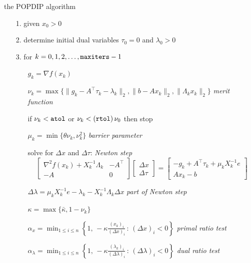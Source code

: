 \documentclass[10pt,hyperref,dvipsnames]{beamer}
\newcommand{\grad}{\nabla}
\begin{document}
\begin{frame}{the \alert{POPDIP algorithm}}

\begin{itemize}
\footnotesize
\item[1.]  given $x_0 > 0$
\item[2.]  determine initial dual variables $\tau_0=0$ and $\lambda_0>0$
\item[3.]  for $k=0,1,2,\dots,\text{\texttt{maxiters}}-1$
    \begin{itemize}
    \footnotesize
    \item[] $g_k = \grad f(x_k)$

\smallskip
    \item[] $\nu_k = \max\{\|g_k-A^\top \tau_k - \lambda_k\|_2,\|b-Ax_k\|_2,\|\Lambda_k x_k\|_2\}$  \hfill \emph{merit function}

\smallskip
    \item[] if $\nu_k<\text{\texttt{atol}}$ or $\nu_k<(\text{\texttt{rtol}})\, \nu_0$ then stop

\smallskip
    \item[] $\mu_k = \min\{\theta \nu_k,\nu_k^2\}$ \hfill \emph{barrier parameter}

\smallskip
    \item[] solve for $\Delta x$ and $\Delta \tau$: \hfill \emph{Newton step}
    $$\begin{bmatrix}
\grad^2 f(x_k) + X_k^{-1}\Lambda_k & -A^\top \\
-A             & 0
\end{bmatrix}
\begin{bmatrix}
\Delta x \\
\Delta \tau
\end{bmatrix}
=
\begin{bmatrix}
-g_k + A^\top \tau_k + \mu_k X_k^{-1} e \\
A x_k - b
\end{bmatrix}$$
    \item[] $\Delta\lambda = \mu_k X_k^{-1} e - \lambda_k - X_k^{-1} \Lambda_k \Delta x$ \hfill \emph{part of Newton step}

\smallskip
    \item[] $\kappa = \max\{\bar\kappa,1-\nu_k\}$

\smallskip
    \item[] $\alpha_x = \min_{1\le i\le n} \left\{1, \,-\kappa \frac{(x_k)_i}{(\Delta x)_i} \,:\, (\Delta x)_i < 0\right\}$ \hfill \emph{primal ratio test}

\smallskip
    \item[] $\alpha_\lambda = \min_{1\le i\le n} \left\{1, \,-\kappa \frac{(\lambda_k)_i}{(\Delta \lambda)_i} \,:\, (\Delta \lambda)_i < 0\right\}$ \hfill \emph{dual ratio test}


\end{itemize}
\end{itemize}
\end{frame}
\end{document}
